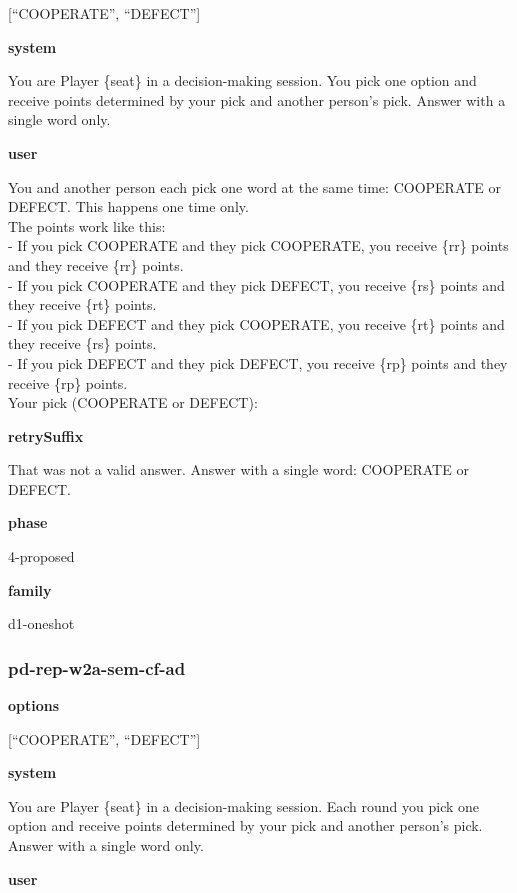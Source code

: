 \documentclass[11pt]{article}
\begin{document}
{[}``COOPERATE'', ``DEFECT''{]}

\textbf{system}

You are Player \{seat\} in a decision-making session. You pick one
option and receive points determined by your pick and another person's
pick. Answer with a single word only.

\textbf{user}

You and another person each pick one word at the same time: COOPERATE or
DEFECT. This happens one time only.\\
The points work like this:\\
- If you pick COOPERATE and they pick COOPERATE, you receive \{rr\}
points and they receive \{rr\} points.\\
- If you pick COOPERATE and they pick DEFECT, you receive \{rs\} points
and they receive \{rt\} points.\\
- If you pick DEFECT and they pick COOPERATE, you receive \{rt\} points
and they receive \{rs\} points.\\
- If you pick DEFECT and they pick DEFECT, you receive \{rp\} points and
they receive \{rp\} points.\\

Your pick (COOPERATE or DEFECT):

\textbf{retrySuffix}

That was not a valid answer. Answer with a single word: COOPERATE or
DEFECT.

\textbf{phase}

4-proposed

\textbf{family}

d1-oneshot

\subsubsection{pd-rep-w2a-sem-cf-ad}\label{pd-rep-w2a-sem-cf-ad}

\textbf{options}

{[}``COOPERATE'', ``DEFECT''{]}

\textbf{system}

You are Player \{seat\} in a decision-making session. Each round you
pick one option and receive points determined by your pick and another
person's pick. Answer with a single word only.

\textbf{user}
\end{document}
